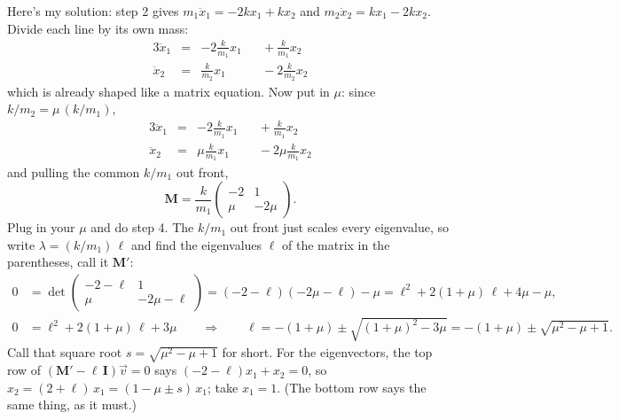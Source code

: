 \documentclass[12pt]{article}
\numberwithin{equation}{section}
\begin{document}
\newpage
Here's my solution: step 2 gives $m_1\ddot{x}_1 = -2kx_1 + kx_2$ and
$m_2\ddot{x}_2 = kx_1 - 2kx_2$. Divide each line by its own mass:
\begin{alignat*}{3}
  \ddot{x}_1 &={}& -2\frac{k}{m_1}x_1 && {}+\frac{k}{m_1}x_2 \\
  \ddot{x}_2 &={}& \frac{k}{m_2}x_1 && {}-2\frac{k}{m_2}x_2
\end{alignat*}
which is already shaped like a matrix equation. Now put in $\mu$: since
$k/m_2 = \mu\,(k/m_1)$,
\begin{alignat*}{3}
  \ddot{x}_1 &={}& -2\frac{k}{m_1}x_1 && {}+\frac{k}{m_1}x_2 \\
  \ddot{x}_2 &={}& \mu\frac{k}{m_1}x_1 && {}-2\mu\frac{k}{m_1}x_2
\end{alignat*}
and pulling the common $k/m_1$ out front,
\begin{equation}
  \mathbf{M} = \frac{k}{m_1}\begin{pmatrix} -2 & 1 \\ \mu & -2\mu \end{pmatrix}.
\end{equation}
Plug in your $\mu$ and do step 4. The $k/m_1$ out front just scales every eigenvalue, so write $\lambda =
(k/m_1)\,\ell$ and find the eigenvalues $\ell$ of the matrix in the
parentheses, call it $\mathbf{M}'$:
\begin{align*}
  0 &= \det\begin{pmatrix} -2 - \ell & 1 \\ \mu & -2\mu - \ell \end{pmatrix}
     = (-2 - \ell)(-2\mu - \ell) - \mu
     = \ell^2 + 2(1 + \mu)\,\ell + 4\mu - \mu, \\
  0 &= \ell^2 + 2(1 + \mu)\,\ell + 3\mu
  \qquad\Longrightarrow\qquad
  \ell = -(1 + \mu) \pm \sqrt{(1 + \mu)^2 - 3\mu}
       = -(1 + \mu) \pm \sqrt{\mu^2 - \mu + 1}.
\end{align*}
Call that square root $s = \sqrt{\mu^2 - \mu + 1}$ for short. For the
eigenvectors, the top row of $(\mathbf{M}' - \ell\,\mathbf{I})\vec{v} = 0$
says $(-2 - \ell)x_1 + x_2 = 0$, so $x_2 = (2 + \ell)\,x_1 = (1 - \mu \pm
s)\,x_1$; take $x_1 = 1$. (The bottom row says the same thing, as it must.)
\end{document}
